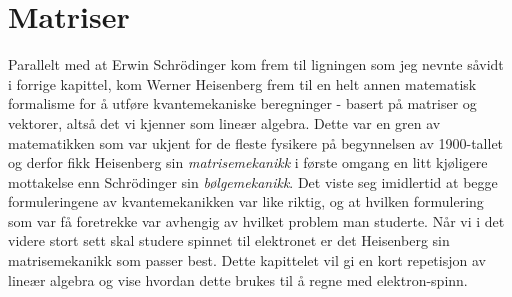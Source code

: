\chapter{Matriser}

Parallelt med at Erwin Schr\"odinger kom frem til ligningen som jeg nevnte såvidt i forrige kapittel, kom Werner Heisenberg frem til en helt annen matematisk formalisme for å utføre kvantemekaniske beregninger - basert på matriser og vektorer, altså det vi kjenner som lineær algebra. Dette var en gren av matematikken som var ukjent for de fleste fysikere på begynnelsen av 1900-tallet og derfor fikk Heisenberg sin \emph{matrisemekanikk} i første omgang en litt kjøligere mottakelse enn Schr\"odinger sin \emph{bølgemekanikk}. Det viste seg imidlertid at begge formuleringene av kvantemekanikken var like riktig, og at hvilken formulering som var få foretrekke var avhengig av hvilket problem man studerte. Når vi i det videre stort sett skal studere spinnet til elektronet er det Heisenberg sin matrisemekanikk som passer best. Dette kapittelet vil gi en kort repetisjon av lineær algebra og vise hvordan dette brukes til å regne med elektron-spinn.


